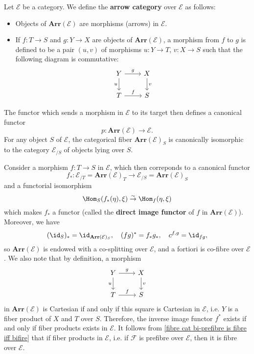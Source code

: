 \begin{example}
Let $\mathcal{E}$ be a category. We define the \textbf{arrow category} over $\mathcal{E}$ as follows:
\begin{itemize}
\item Objects of $\mathbf{Arr}(\mathcal{E})$ are morphisms (arrows) in $\mathcal{E}$.
\item If $f:T\to S$ and $g:Y\to X$ are objects of $\mathbf{Arr}(\mathcal{E})$, a morphism from $f$ to $g$ is defined to be a pair $(u,v)$ of morphisms $u:Y\to T$, $v:X\to S$ such that the following diagram is commutative:
\[\begin{tikzcd}
Y\ar[d,swap,"u"]\ar[r,"g"]&X\ar[d,"v"]\\
T\ar[r,"f"]&S
\end{tikzcd}\]
\end{itemize}
The functor which sends a morphism in $\mathcal{E}$ to its target then defines a canonical functor
\[p:\mathbf{Arr}(\mathcal{E})\to \mathcal{E}.\]
For any object $S$ of $\mathcal{E}$, the categorical fiber $\mathbf{Arr}(\mathcal{E})_S$ is canonically isomorphic to the category $\mathcal{E}_{/S}$ of objects lying over $S$.\par
Consider a morphism $f:T\to S$ in $\mathcal{E}$, which then correponds to a canonical functor
\[f_*:\mathcal{E}_{/T}=\mathbf{Arr}(\mathcal{E})_T\to \mathcal{E}_{/S}=\mathbf{Arr}(\mathcal{E})_S\]
and a functorial isomorphism
\[\Hom_S(f_*(\eta),\xi)\stackrel{\sim}{\to }\Hom_f(\eta,\xi)\]
which makes $f_*$ a functor (called the \textbf{direct image functor} of $f$ in $\mathbf{Arr}(\mathcal{E})$). Moreover, we have 
\[(\id_S)_*=\id_{\mathbf{Arr}(\mathcal{E})_S},\quad (fg)^*=f_*g_*,\quad c^{f,g}=\id_{fg},\]
so $\mathbf{Arr}(\mathcal{E})$ is endowed with a co-splitting over $\mathcal{E}$, and a fortiori is co-fibre over $\mathcal{E}$. We also note that by definition, a morphism
\[\begin{tikzcd}
Y\ar[d,swap,"u"]\ar[r,"g"]&X\ar[d,"v"]\\
T\ar[r,"f"]&S
\end{tikzcd}\]
in $\mathbf{Arr}(\mathcal{E})$ is Cartesian if and only if this square is Cartesian in $\mathcal{E}$, i.e. $Y$ is a fiber product of $X$ and $T$ over $S$. Therefore, the inverse image functor $f^*$ exists if and only if fiber products exists in $\mathcal{E}$. It follows from \cref{fibre cat bi-prefibre is fibre iff bifire} that if fiber products in $\mathcal{E}$, i.e. if $\mathcal{F}$ is prefibre over $\mathcal{E}$, then it is fibre over $\mathcal{E}$.
\end{example}

